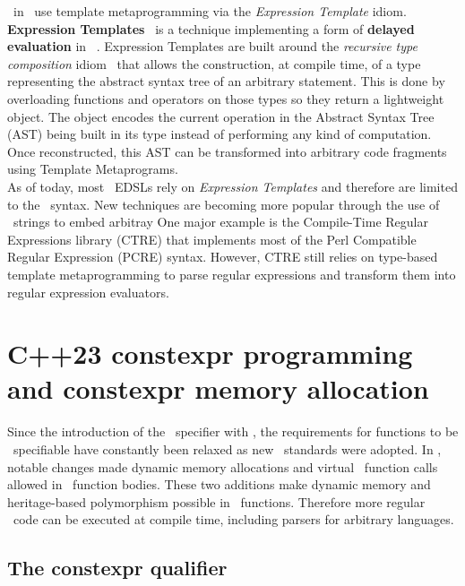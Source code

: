 \documentclass[../../main.tex]{subfiles}
\begin{document}
\dsels~in \cpp~use template metaprogramming via the \textit{Expression
Template} idiom.
\textbf{Expression Templates}~\cite{veldhuizen:1995,vandevoorde:2002} is a
technique implementing a
form of \textbf{delayed evaluation} in \cpp~\cite{spinellis:2001}. Expression
Templates are built around the \textit{recursive type composition}
idiom~\cite{jarvi:1998} that allows the construction, at compile time, of a type
representing the abstract syntax tree of an arbitrary statement. This is done by
overloading functions and operators on those types so they return a lightweight
object. The object encodes the current operation in the Abstract Syntax Tree
(AST) being built in its type instead of performing any kind of computation. Once
reconstructed, this AST can be transformed into arbitrary code fragments using
Template Metaprograms.\\

As of today, most \cpp~EDSLs rely on \textit{Expression Templates} and therefore
are limited to the \cpp~syntax. New techniques are becoming more popular through
the use of \constexpr~strings to embed arbitray  One major example is
the Compile-Time Regular Expressions library (CTRE)\cite{ctre} that implements
most of the Perl Compatible Regular Expression (PCRE) syntax. However, CTRE
still relies on type-based template metaprogramming to parse regular expressions
and transform them into regular expression evaluators.


\section{C++23 constexpr programming and constexpr memory allocation}

Since the introduction of the \constexpr~specifier with , the requirements
for functions to be \constexpr~specifiable have constantly been relaxed as new
\cpp~standards were adopted. In , notable changes made dynamic memory
allocations\cite{constexpr-memory} and virtual \constexpr~function
calls\cite{virtual-constexpr} allowed in \constexpr~function
bodies. These two additions make dynamic memory and heritage-based polymorphism
possible in \constexpr~functions. Therefore more regular \cpp~code can be
executed at compile time, including parsers for arbitrary languages.

\subsection{The constexpr qualifier}
\end{document}
